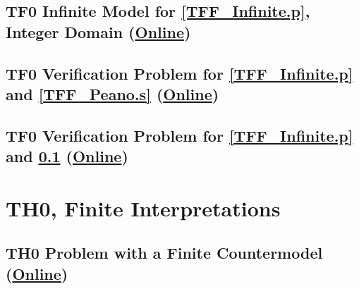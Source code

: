 \documentclass{easychair}
\begin{document}
\newpage
\subsection{TF0 Infinite Model for \ref{TFF_Infinite.p}, Integer Domain
(\href{https://raw.githubusercontent.com/GeoffsPapers/InterpretationFormat/master/Examples/TFF_Integer.s}{Online})}
\label{TFF_Integer.s}
\begin{small}

\end{small}

\newpage
\subsection{TF0 Verification Problem for \ref{TFF_Infinite.p} and \ref{TFF_Peano.s}
(\href{https://raw.githubusercontent.com/GeoffsPapers/InterpretationFormat/master/Examples/TFF_Peano.s.p}{Online})}
\label{TFF_Peano.s.p}
\begin{small}

\end{small}

\newpage
\subsection{TF0 Verification Problem for \ref{TFF_Infinite.p} and \ref{TFF_Integer.s}
(\href{https://raw.githubusercontent.com/GeoffsPapers/InterpretationFormat/master/Examples/TFF_Integer.s.p}{Online})}
\label{TFF_Integer.s.p}
\begin{small}

\end{small}

\newpage
\section{TH0, Finite Interpretations}
\label{TH0Finite}

\subsection{TH0 Problem with a Finite Countermodel
(\href{https://raw.githubusercontent.com/GeoffsPapers/InterpretationFormat/master/Examples/THF_Finite.p}{Online})}
\label{THF_Finite.p}
\begin{small}

\end{small}
\end{document}

